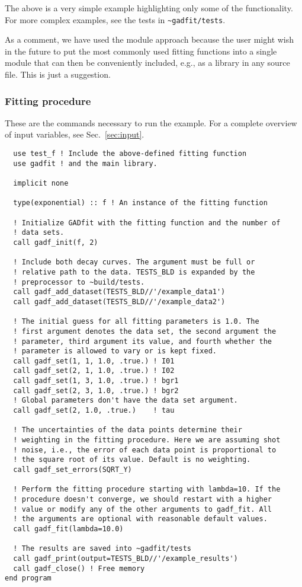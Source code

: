 \documentclass{article}
\begin{document}
The above is a very simple example highlighting only some of the functionality. For more complex examples, see the tests in \verb+~gadfit/tests+.

As a comment, we have used the module approach because the user might wish in the future to put the most commonly used fitting functions into a single module that can then be conveniently included, e.g., as a library in any source file. This is just a suggestion.

\subsubsection{Fitting procedure}

These are the commands necessary to run the example. For a complete overview of input variables, see Sec.~\ref{sec:input}.
\begin{verbatim}
  use test_f ! Include the above-defined fitting function
  use gadfit ! and the main library.

  implicit none

  type(exponential) :: f ! An instance of the fitting function

  ! Initialize GADfit with the fitting function and the number of
  ! data sets.
  call gadf_init(f, 2)

  ! Include both decay curves. The argument must be full or
  ! relative path to the data. TESTS_BLD is expanded by the
  ! preprocessor to ~build/tests.
  call gadf_add_dataset(TESTS_BLD//'/example_data1')
  call gadf_add_dataset(TESTS_BLD//'/example_data2')

  ! The initial guess for all fitting parameters is 1.0. The
  ! first argument denotes the data set, the second argument the
  ! parameter, third argument its value, and fourth whether the
  ! parameter is allowed to vary or is kept fixed.
  call gadf_set(1, 1, 1.0, .true.) ! I01
  call gadf_set(2, 1, 1.0, .true.) ! I02
  call gadf_set(1, 3, 1.0, .true.) ! bgr1
  call gadf_set(2, 3, 1.0, .true.) ! bgr2
  ! Global parameters don't have the data set argument.
  call gadf_set(2, 1.0, .true.)    ! tau

  ! The uncertainties of the data points determine their
  ! weighting in the fitting procedure. Here we are assuming shot
  ! noise, i.e., the error of each data point is proportional to
  ! the square root of its value. Default is no weighting.
  call gadf_set_errors(SQRT_Y)

  ! Perform the fitting procedure starting with lambda=10. If the
  ! procedure doesn't converge, we should restart with a higher
  ! value or modify any of the other arguments to gadf_fit. All
  ! the arguments are optional with reasonable default values.
  call gadf_fit(lambda=10.0)

  ! The results are saved into ~gadfit/tests
  call gadf_print(output=TESTS_BLD//'/example_results')
  call gadf_close() ! Free memory
end program
\end{verbatim}
\end{document}
